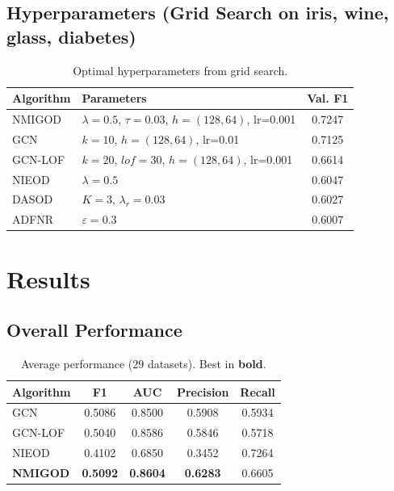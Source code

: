 \documentclass[11pt,a4paper,twocolumn]{article}
\begin{document}
\subsection{Hyperparameters (Grid Search on iris, wine, glass, diabetes)}
\begin{table}[H]
\centering
\caption{Optimal hyperparameters from grid search.}
\small
\begin{tabular}{llc}
\toprule
Algorithm & Parameters & Val. F1 \\
\midrule
NMIGOD & $\lambda{=}0.5$, $\tau{=}0.03$, $h{=}(128,64)$, lr{=}0.001 & 0.7247 \\
GCN & $k{=}10$, $h{=}(128,64)$, lr{=}0.01 & 0.7125 \\
GCN-LOF & $k{=}20$, $lof{=}30$, $h{=}(128,64)$, lr{=}0.001 & 0.6614 \\
NIEOD & $\lambda{=}0.5$ & 0.6047 \\
DASOD & $K{=}3$, $\lambda_r{=}0.03$ & 0.6027 \\
ADFNR & $\varepsilon{=}0.3$ & 0.6007 \\
\bottomrule
\end{tabular}
\end{table}

\section{Results}
\subsection{Overall Performance}
\begin{table}[H]
\centering
\caption{Average performance (29 datasets). Best in \textbf{bold}.}
\begin{tabular}{lcccc}
\toprule
Algorithm & F1 & AUC & Precision & Recall \\
\midrule
GCN & 0.5086 & 0.8500 & 0.5908 & 0.5934 \\
GCN-LOF & 0.5040 & 0.8586 & 0.5846 & 0.5718 \\
NIEOD & 0.4102 & 0.6850 & 0.3452 & 0.7264 \\
\textbf{NMIGOD} & \textbf{0.5092} & \textbf{0.8604} & \textbf{0.6283} & 0.6605 \\
\bottomrule
\end{tabular}
\end{table}
\end{document}
